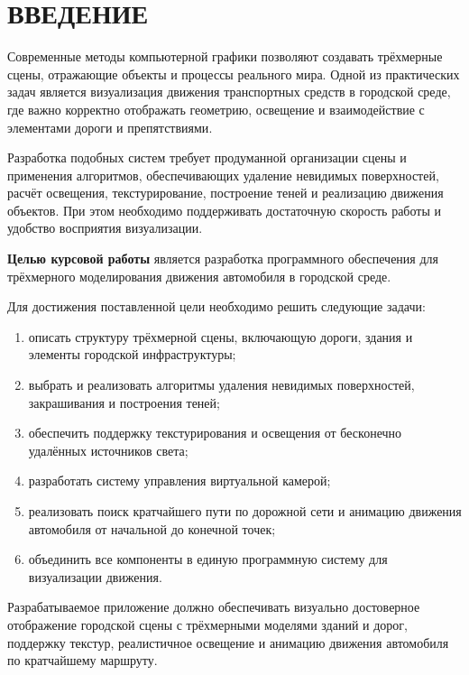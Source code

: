 \chapter*{ВВЕДЕНИЕ}

Современные методы компьютерной графики позволяют создавать трёхмерные сцены, отражающие объекты и процессы реального мира. Одной из практических задач является визуализация движения транспортных средств в городской среде, где важно корректно отображать геометрию, освещение и взаимодействие с элементами дороги и препятствиями\cite{carla_dosovitskiy_2017}.

Разработка подобных систем требует продуманной организации сцены и применения алгоритмов, обеспечивающих удаление невидимых поверхностей, расчёт освещения, текстурирование, построение теней и реализацию движения объектов. При этом необходимо поддерживать достаточную скорость работы и удобство восприятия визуализации.

\textbf{Целью курсовой работы} является разработка программного обеспечения для трёхмерного моделирования движения автомобиля в городской среде.

Для достижения поставленной цели необходимо решить следующие задачи:
\begin{enumerate}
	\item описать структуру трёхмерной сцены, включающую дороги, здания и элементы городской инфраструктуры;
	\item выбрать и реализовать алгоритмы удаления невидимых поверхностей, закрашивания и построения теней;
	\item обеспечить поддержку текстурирования и освещения от бесконечно удалённых источников света;
	\item разработать систему управления виртуальной камерой;
	\item реализовать поиск кратчайшего пути по дорожной сети и анимацию движения автомобиля от начальной до конечной точек;
	\item объединить все компоненты в единую программную систему для визуализации движения.
\end{enumerate}

Разрабатываемое приложение должно обеспечивать визуально достоверное отображение городской сцены с трёхмерными моделями зданий и дорог, поддержку текстур, реалистичное освещение и анимацию движения автомобиля по кратчайшему маршруту.

